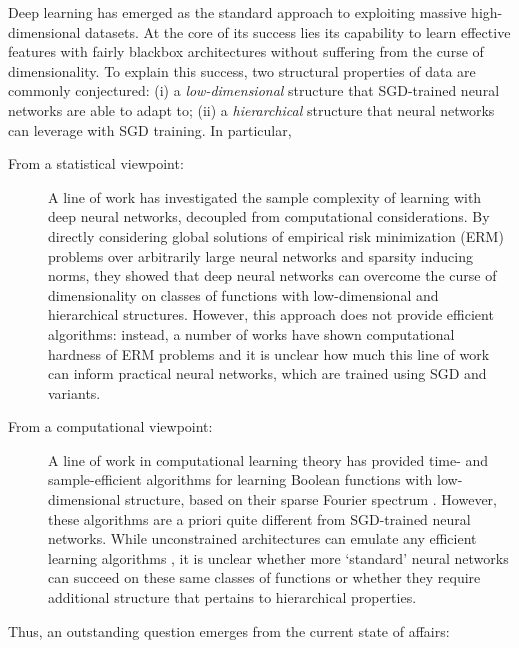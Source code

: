 \documentclass[11pt]{article}
\newcommand{\<}{\langle}
\renewcommand{\>}{\rangle}
\theoremstyle{definition}
\begin{document}
Deep learning has emerged as the standard approach to exploiting massive high-dimensional datasets. At the core of its success lies its capability to learn effective features with fairly blackbox architectures without suffering from the curse of dimensionality. To explain this success, two structural properties of data are commonly conjectured: (i) a {\it low-dimensional} structure that SGD-trained neural networks are able to adapt to; (ii) a {\it hierarchical} structure that neural networks can leverage with SGD training. In particular,  
\begin{description}
\item[From a statistical viewpoint:] A line of work \citep{bach2017breaking,schmidt2020nonparametric,kohler2016nonparametric,bauer2019deep} has investigated the sample complexity of learning with deep neural networks, decoupled from computational considerations. By directly considering global solutions of empirical risk minimization (ERM) problems over arbitrarily large neural networks and sparsity inducing norms, they showed that deep neural networks can overcome the curse of dimensionality on classes of functions with low-dimensional and hierarchical structures. However, this approach does not provide efficient algorithms: instead, a number of works have shown computational hardness of ERM problems \citep{blum1988training,klivans2009cryptographic,daniely2014average} and it is unclear how much this line of work can inform practical neural networks, which are trained using SGD and variants.


\item[From a computational viewpoint:] A line of work in computational learning theory has provided time- and sample-efficient algorithms for learning  Boolean functions with low-dimensional structure,
based on their sparse Fourier spectrum
\citep{mansour1994,odonnell_2014}. However, these algorithms are a priori quite different from SGD-trained neural networks. While unconstrained architectures can emulate any efficient learning algorithms \citep{abbe2020universality,abbe2021power}, it is unclear whether more `standard' neural networks can succeed on these same classes of functions or whether they require additional structure that pertains to hierarchical properties.



\end{description}

Thus, an outstanding question emerges from the current state of affairs:
\end{document}
